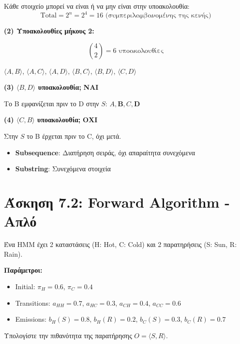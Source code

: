 Κάθε στοιχείο μπορεί να είναι ή να μην είναι στην υποακολουθία:
$$\text{Total} = 2^n = 2^4 = 16 \text{ (συμπεριλαμβανομένης της κενής)}$$

\textbf{(2) Υποακολουθίες μήκους 2:}

$$\binom{4}{2} = 6 \text{ υποακολουθίες}$$

$\langle A, B \rangle$, $\langle A, C \rangle$, $\langle A, D \rangle$,
$\langle B, C \rangle$, $\langle B, D \rangle$, $\langle C, D \rangle$

\textbf{(3) $\langle B, D \rangle$ υποακολουθία;} \textbf{ΝΑΙ}

Το B εμφανίζεται πριν το D στην $S$: $A, \mathbf{B}, C, \mathbf{D}$

\textbf{(4) $\langle C, B \rangle$ υποακολουθία;} \textbf{ΟΧΙ}

Στην $S$ το B έρχεται πριν το C, όχι μετά.

\begin{infobox}
\begin{itemize}
    \item \textbf{Subsequence}: Διατήρηση σειράς, όχι απαραίτητα συνεχόμενα
    \item \textbf{Substring}: Συνεχόμενα στοιχεία
\end{itemize}
\end{infobox}

\section{Άσκηση 7.2: Forward Algorithm - Απλό}

\begin{formulabox}[Εκφώνηση]
Ένα HMM έχει 2 καταστάσεις (H: Hot, C: Cold) και 2 παρατηρήσεις (S: Sun, R: Rain).

\textbf{Παράμετροι:}
\begin{itemize}
    \item Initial: $\pi_H = 0.6$, $\pi_C = 0.4$
    \item Transitions: $a_{HH} = 0.7$, $a_{HC} = 0.3$, $a_{CH} = 0.4$, $a_{CC} = 0.6$
    \item Emissions: $b_H(S) = 0.8$, $b_H(R) = 0.2$, $b_C(S) = 0.3$, $b_C(R) = 0.7$
\end{itemize}

Υπολογίστε την πιθανότητα της παρατήρησης $O = \langle S, R \rangle$.
\end{formulabox}

